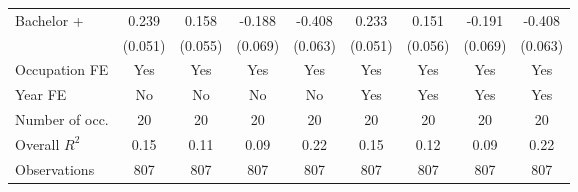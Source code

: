 \begin{landscape}
\begin{center}
\begin{threeparttable}[!h]
\begin{tabular}{lcccccccc}
Bachelor +          &       0.239\sym{***}&       0.158\sym{**} &      -0.188\sym{**} &      -0.408\sym{***}&       0.233\sym{***}&       0.151\sym{**} &      -0.191\sym{**} &      -0.408\sym{***}\\
                    &     (0.051)         &     (0.055)         &     (0.069)         &     (0.063)         &     (0.051)         &     (0.056)         &     (0.069)         &     (0.063)         \\
Occupation FE       &         Yes         &         Yes         &         Yes         &         Yes         &         Yes         &         Yes         &         Yes         &         Yes         \\
Year FE             &          No         &          No         &          No         &          No         &         Yes         &         Yes         &         Yes         &         Yes         \\
\midrule Number of occ.&          20         &          20         &          20         &          20         &          20         &          20         &          20         &          20         \\
Overall $ R^2$      &        0.15         &        0.11         &        0.09         &        0.22         &        0.15         &        0.12         &        0.09         &        0.22         \\
Observations        &         807         &         807         &         807         &         807         &         807         &         807         &         807         &         807         \\
\bottomrule
\bottomrule
\end{tabular}
\end{threeparttable}
\end{center}
\end{landscape}
